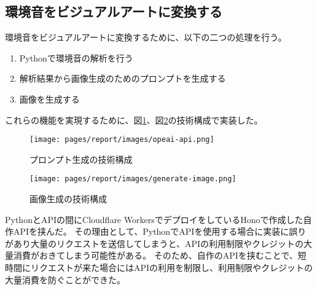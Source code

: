 \subsection{環境音をビジュアルアートに変換する}
環境音をビジュアルアートに変換するために、以下の二つの処理を行う。
\begin{enumerate}
  \item Pythonで環境音の解析を行う
  \item 解析結果から画像生成のためのプロンプトを生成する
  \item 画像を生成する
\end{enumerate}
これらの機能を実現するために、図\ref{fig:generate-prompt}、図\ref{fig:generate-image}の技術構成で実装した。
\begin{figure}[h]
  \centering
  \texttt{[image: pages/report/images/opeai-api.png]}
  \caption{プロンプト生成の技術構成}
  \label{fig:generate-prompt}
\end{figure}
\begin{figure}[h]
  \centering
  \texttt{[image: pages/report/images/generate-image.png]}
  \caption{画像生成の技術構成}
  \label{fig:generate-image}
\end{figure}
PythonとAPIの間にCloudflare WorkersでデプロイをしているHonoで作成した自作APIを挟んだ。
その理由として、PythonでAPIを使用する場合に実装に誤りがあり大量のリクエストを送信してしまうと、APIの利用制限やクレジットの大量消費がおきてしまう可能性がある。
そのため、自作のAPIを挟むことで、短時間にリクエストが来た場合にはAPIの利用を制限し、利用制限やクレジットの大量消費を防ぐことができた。

